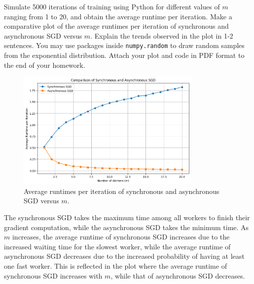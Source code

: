 \documentclass[a3paper,12pt]{extarticle} %
\begin{document}
\begin{enumerate}
Simulate 5000 iterations of training using Python for different values of $m$ ranging from 1 to 20, and obtain the average runtime per iteration. Make a comparative plot of the average runtimes per iteration of synchronous and asynchronous SGD versus $m$. Explain the trends observed in the plot in 1-2 sentences. You may use packages inside \texttt{numpy.random} to draw random samples from the exponential distribution. Attach your plot and code in PDF format to the end of your homework.
\begin{figure}[H]
\centering
\includegraphics[width=0.8\textwidth]{asynchronousVsynchronous.png}
\caption{Average runtimes per iteration of synchronous and asynchronous SGD versus $m$.}
\end{figure}

The synchronous SGD takes the maximum time among all workers to finish their gradient computation, while the asynchronous SGD takes the minimum time. As $m$ increases, the average runtime of synchronous SGD increases due to the increased waiting time for the slowest worker, while the average runtime of asynchronous SGD decreases due to the increased probability of having at least one fast worker. This is reflected in the plot where the average runtime of synchronous SGD increases with $m$, while that of asynchronous SGD decreases.



\end{enumerate}
\end{document}
